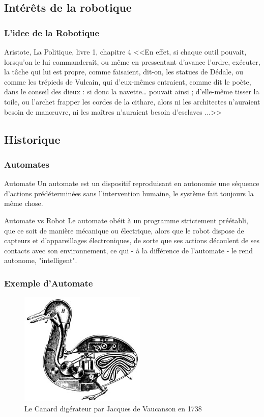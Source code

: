 \documentclass{beamer}
\begin{document}
\subsection{Intérêts de la robotique}
\begin{frame}
  \frametitle{L'idee de la Robotique}
  
  \begin{block}{Aristote, La Politique, livre 1, chapitre 4}
  <<En effet, si chaque outil pouvait, lorsqu’on le lui commanderait, ou même en pressentant d’avance l’ordre, exécuter, la tâche qui lui est propre, comme faisaient, dit-on, les statues de Dédale, ou comme les trépieds de Vulcain, qui d’eux-mêmes entraient, comme dit le poète, dans le conseil des dieux : si donc la navette… pouvait ainsi ; d’elle-même tisser la toile, ou l’archet frapper les cordes de la cithare, alors ni les  architectes n’auraient besoin de manœuvre, ni les maîtres n’auraient besoin d’esclaves ...>> 
  \end{block}

\end{frame}

\subsection{Historique}


\begin{frame}
  \frametitle{Automates}
  
  \begin{block}{Automate}
 Un automate est un dispositif reproduisant en autonomie une séquence d'actions prédéterminées sans l'intervention humaine, le système fait toujours la même chose.
\end{block}

\begin{block}{Automate vs Robot}
  Le automate obéit à un programme strictement préétabli, que ce soit de manière mécanique ou électrique, alors que le robot dispose de capteurs et d'appareillages électroniques, de sorte que ses actions découlent de ses contacts avec son environnement, ce qui - à la différence de l'automate - le rend autonome, "intelligent".
\end{block}

\end{frame}

\begin{frame}
  \frametitle{Exemple d'Automate}
  \begin{figure}[!h]
  \centering
  \includegraphics[width=6cm]{Duck_of_Vaucanson.jpg}
  \caption{Le Canard digérateur par Jacques de Vaucanson en 1738}
  \end{figure}
\end{frame}
\end{document}
